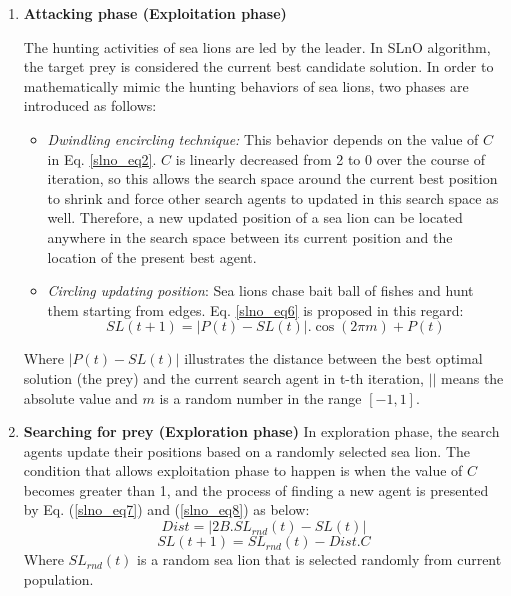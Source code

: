 \documentclass[../main.tex]{subfiles}
\begin{document}
\begin{enumerate}
\item \textbf{Attacking phase (Exploitation phase)}
 
 The hunting activities of sea lions are led by the leader. In SLnO algorithm, the target prey is considered the current best candidate solution. In order to mathematically mimic the hunting behaviors of sea lions, two phases are introduced as follows:
 	
\begin{itemize}
\item \textit{Dwindling encircling technique:}
	This behavior depends on the value of $C$ in Eq. \ref{slno_eq2}. $C$ is linearly decreased from 2 to 0 over the course of iteration, so this allows the search space around the current best position to shrink and force other search agents to updated in this search space as well. Therefore, a new updated position of a sea lion can be located anywhere in the search space between its current position and the location of the present best agent.

\item \textit{Circling updating position}: Sea lions chase bait ball of fishes and hunt them starting from edges. Eq. \ref{slno_eq6} is proposed in this regard:
\begin{equation} \label{slno_eq6}
SL(t+1) = |P(t) - SL(t)|.\cos(2 \pi m) + P(t)
\end{equation}	
\end{itemize}
	Where $|P(t) - SL(t)|$ illustrates the distance between the best optimal solution (the prey) and the current search agent in t-th iteration, $||$ means the absolute value and $m$ is a random number in the range $[-1, 1]$.
	
\item \textbf{Searching for prey (Exploration phase)}
	In exploration phase, the search agents update their positions based on a randomly selected sea lion. The condition that allows exploitation phase to happen is when the value of $C$ becomes greater than 1, and the process of finding a new agent is presented by Eq. (\ref{slno_eq7}) and (\ref{slno_eq8}) as below:
\begin{equation}\label{slno_eq7}
Dist = |2B.SL_{rnd}(t) - SL(t)|
\end{equation}
\begin{equation}\label{slno_eq8}
SL(t+1) = SL_{rnd}(t) - Dist.C 
\end{equation}  
Where $SL_{rnd}(t)$ is a random sea lion that is selected randomly from current population.

\end{enumerate}	
\end{document}
